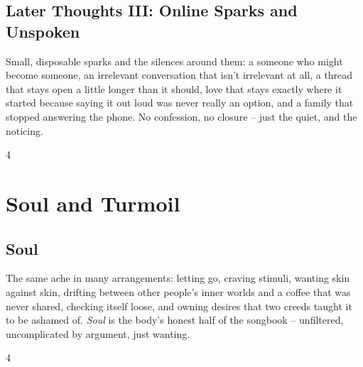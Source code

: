 \documentclass[a4paper,landscape]{memoir}
\begin{document}
\chapter{Later Thoughts III: Online Sparks and Unspoken}
Small, disposable sparks and the silences around them: a someone who might become someone, an irrelevant conversation that isn't irrelevant at all, a thread that stays open a little longer than it should, love that stays exactly where it started because saying it out loud was never really an option, and a family that stopped answering the phone. No confession, no closure -- just the quiet, and the noticing.
\clearpage\begin{multicols*}{4}

















\end{multicols*}

\part{Soul and Turmoil}

\chapter{Soul}
The same ache in many arrangements: letting go, craving stimuli, wanting skin against skin, drifting between other people's inner worlds and a coffee that was never shared, checking itself loose, and owning desires that two creeds taught it to be ashamed of. \emph{Soul} is the body's honest half of the songbook -- unfiltered, uncomplicated by argument, just wanting.
\clearpage\begin{multicols*}{4}












\end{multicols*}
\end{document}
